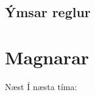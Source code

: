 \documentclass[handout]{beamer}
\begin{document}
\subsection{Ýmsar reglur}

\section{Magnarar}


\begin{frame}{Næst}
Í næsta tíma:
\end{frame}
\end{document}
